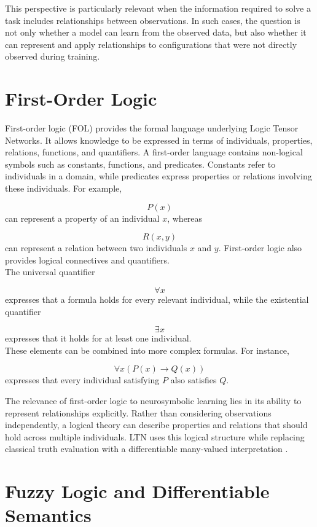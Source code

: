 \noindent
This perspective is particularly relevant when the information required to solve a task includes relationships between observations. In such cases, the question is not only whether a model can learn from the observed data, but also whether it can represent and apply relationships to configurations that were not directly observed during training.

\section{First-Order Logic}

\noindent
First-order logic (FOL) provides the formal language underlying Logic Tensor Networks. It allows knowledge to be expressed in terms of individuals, properties, relations, functions, and quantifiers.
A first-order language contains non-logical symbols such as constants, functions, and predicates. Constants refer to individuals in a domain, while predicates express properties or relations involving these individuals. For example,

$$
P(x)
$$
can represent a property of an individual $x$, whereas

$$
R(x,y)
$$
can represent a relation between two individuals $x$ and $y$.
First-order logic also provides logical connectives and quantifiers. \\
The universal quantifier

$$
\forall x
$$
\noindent
expresses that a formula holds for every relevant individual, while the existential quantifier

$$
\exists x
$$
expresses that it holds for at least one individual.
\noindent
\\
These elements can be combined into more complex formulas. For instance,

$$
\forall x \left(P(x) \rightarrow Q(x)\right)
$$
\noindent
expresses that every individual satisfying $P$ also satisfies $Q$.

\noindent
The relevance of first-order logic to neurosymbolic learning lies in its ability to represent relationships explicitly. Rather than considering observations independently, a logical theory can describe properties and relations that should hold across multiple individuals. LTN uses this logical structure while replacing classical truth evaluation with a differentiable many-valued interpretation \cite{badreddine2022logic}.

\section{Fuzzy Logic and Differentiable Semantics}

